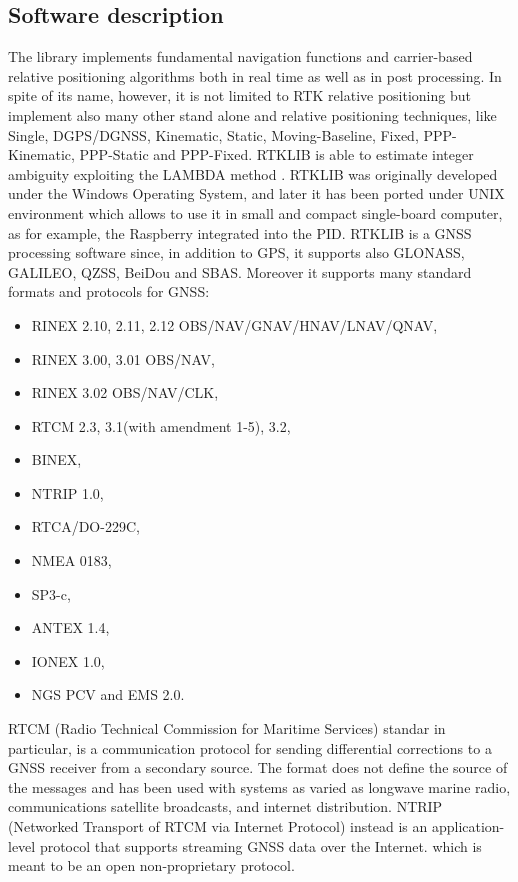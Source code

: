 \subsection{Software description}
The library implements fundamental navigation functions and carrier-based relative positioning algorithms both in real time as well as in post processing. In spite of its name, however, it is not limited to RTK relative positioning but implement also many other stand alone and relative positioning techniques, like Single, DGPS/DGNSS, Kinematic, Static, Moving-Baseline, Fixed, PPP-Kinematic, PPP-Static and PPP-Fixed.
RTKLIB is able to estimate integer ambiguity exploiting the LAMBDA method \cite{Teunissen_ar1995} . 
RTKLIB was originally developed under the Windows Operating System, and later it has been ported under UNIX environment which allows to use it in small and compact single-board computer, as for example, the Raspberry integrated into the PID. 
RTKLIB is a GNSS processing software since, in addition to GPS, it supports also GLONASS, GALILEO, QZSS, BeiDou and SBAS.
Moreover it supports many standard formats and protocols for GNSS: 
\begin{itemize}
\item RINEX 2.10, 2.11, 2.12 OBS/NAV/GNAV/HNAV/LNAV/QNAV,
\item RINEX 3.00, 3.01 OBS/NAV,
\item RINEX 3.02 OBS/NAV/CLK,
\item RTCM 2.3, 3.1(with amendment 1-5), 3.2,
\item BINEX,
\item NTRIP 1.0,
\item RTCA/DO-229C,
\item NMEA 0183,
\item SP3-c,
\item ANTEX 1.4,
\item IONEX 1.0, 
\item NGS PCV and EMS 2.0.
\end{itemize}

RTCM (Radio Technical Commission for Maritime Services) standar in particular, is a communication protocol for sending differential corrections to a GNSS receiver from a secondary source. The format does not define the source of the messages and has been used with systems as varied as longwave marine radio, communications satellite broadcasts, and internet distribution. NTRIP (Networked Transport of RTCM via Internet Protocol) instead is an application-level protocol that
supports streaming GNSS data over the Internet. which is meant to be an open non-proprietary protocol.

